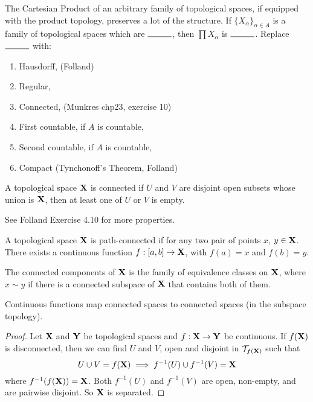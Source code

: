 \documentclass[../main-manifolds.tex]{subfiles}
\begin{document}
\newpage





\newpage


The Cartesian Product of an arbitrary family of topological spaces, if equipped with the product topology, preserves a lot of the structure. If $\{X_\alpha\}_{\alpha\in A}$ is a family of topological spaces which are $\rule{1cm}{0.15mm}$, then $\prod X_\alpha$ is $\rule{1cm}{0.15mm}$. Replace $\rule{1cm}{0.15mm}$ with: 

\begin{enumerate}
    \item Hausdorff, (Folland)
    \item Regular,
    \item Connected, (Munkres chp23, exercise 10)
    \item First countable, if $A$ is countable,
    \item Second countable, if $A$ is countable,
    \item Compact (Tynchonoff's Theorem, Folland)
\end{enumerate}

\newpage


\begin{definition}[Connectedness]\label{chp4:connectedness-definition}
    A topological space ${\mathbf{X}}$ is connected if $U$ and $V$ are disjoint open subsets whose union is ${\mathbf{X}}$, then at least one of $U$ or $V$ is empty.
\end{definition}
See Folland Exercise 4.10 for more properties.

\begin{definition}\label{chp4:path-connectedness-definition}
    A topological space ${\mathbf{X}}$ is path-connected if for any two pair of points $x$, $y\in{\mathbf{X}}$. There exists a continuous function $f:[a,b]\to {\mathbf{X}}$, with $f(a)=x$ and $f(b)=y$.
\end{definition}

\begin{definition}\label{chp4:connected-component-definition}
    The connected components of ${\mathbf{X}}$ is the family of equivalence classes on ${\mathbf{X}}$, where $x\sim y$ if there is a connected subspace of ${\mathbf{X}}$ that contains both of them.
\end{definition}


\begin{wts}
    Continuous functions map connected spaces to connected spaces (in the subspace topology).
\end{wts}
\begin{proof}
    Let ${\mathbf{X}}$ and ${\mathbf{Y}}$ be topological spaces and $f: {\mathbf{X}}\to{\mathbf{Y}}$ be continuous. If $f({\mathbf{X}})$ is disconnected, then we can find $U$ and $V$, open and disjoint in $\mathcal{T}_{f({\mathbf{X}})}$ such that
    \[
        U\cup V = f({\mathbf{X}})\implies f^{-1}(U)\cup f^{-1}(V) = {\mathbf{X}}
    \]
    where $f^{-1}(f({\mathbf{X}})) = {\mathbf{X}}$. Both $f^{-1}(U)$ and $f^{-1}(V)$ are open, non-empty, and are pairwise disjoint. So ${\mathbf{X}}$ is separated.
\end{proof}
\end{document}
